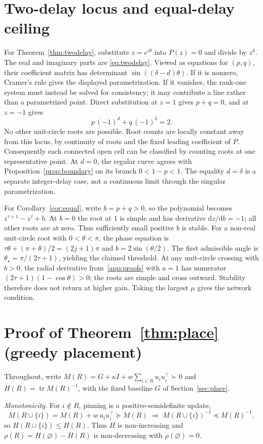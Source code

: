 \documentclass[11pt]{article}
\theoremstyle{definition}
\DeclareMathOperator{\tr}{tr}
\begin{document}
\section{Two-delay locus and equal-delay ceiling}\label{app:twodelay}
For Theorem~\ref{thm:twodelay}, substitute $z=e^{i\theta}$ into $P(z)=0$ and divide by $z^h$.
The real and imaginary parts are \eqref{eq:twodelay}. Viewed as equations for $(p,q)$, their
coefficient matrix has determinant $\sin((\delta-d)\theta)$. If it is nonzero, Cramer's rule gives
the displayed parametrization. If it vanishes, the rank-one system must instead be solved for
consistency; it may contribute a line rather than a parametrized point. Direct substitution at
$z=1$ gives $p+q=0$, and at $z=-1$ gives
\[
  p\,(-1)^d+q\,(-1)^\delta=2 .
\]
No other unit-circle roots are possible. Root counts are locally constant away from this locus,
by continuity of roots and the fixed leading coefficient of $P$. Consequently each connected open
cell can be classified by counting roots at one representative point. At $d=0$, the regular curve
agrees with Proposition~\ref{prop:boundary} on its branch $0<1-p<1$. The equality $d=\delta$ is a
separate integer-delay case, not a continuous limit through the singular parametrization.

For Corollary~\ref{cor:equal}, write $b=p+q>0$, so the polynomial becomes
$z^{\tau+1}-z^\tau+b$. At $b=0$ the root at $1$ is simple and has derivative $\mathrm dz/\mathrm db=-1$;
all other roots are at zero. Thus sufficiently small positive $b$ is stable. For a non-real
unit-circle root with $0<\theta<\pi$, the phase equation is
$\tau\theta+(\pi+\theta)/2=(2j+1)\pi$ and $b=2\sin(\theta/2)$.
The first admissible angle is $\theta_\star=\pi/(2\tau+1)$, yielding the claimed threshold.
At any unit-circle crossing with $b>0$, the radial derivative from~\ref{app:proofs} with $a=1$
has numerator $(2\tau+1)(1-\cos\theta)>0$; the roots are simple and cross outward. Stability
therefore does not return at higher gain. Taking the largest $\mu$ gives the network condition.

\section{Proof of Theorem~\ref{thm:place} (greedy placement)}\label{app:place}
Throughout, write $M(R)=G+\kappa I+w\sum_{i\in R}u_iu_i^\top\succ0$ and $H(R)=\tr M(R)^{-1}$,
with the fixed baseline $G$ of Section~\ref{sec:place}.

\emph{Monotonicity.} For $i\notin R$, pinning is a positive-semidefinite update,
\[
  M(R\cup\{i\})=M(R)+w\,u_iu_i^\top\succeq M(R)
  \;\Longrightarrow\;
  M(R\cup\{i\})^{-1}\preceq M(R)^{-1},
\]
so $H(R\cup\{i\})\le H(R)$. Thus $H$ is non-increasing and $\rho(R)=H(\varnothing)-H(R)$ is non-decreasing
with $\rho(\varnothing)=0$.
\end{document}
